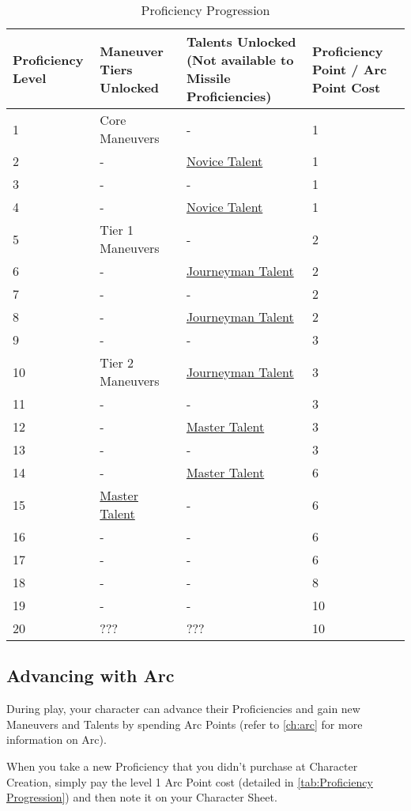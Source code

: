 \documentclass[oneside,11pt,english]{book}
\begin{document}
\begin{longtabu} spread 0pt {X[-2,c] X[c] X[c] X[-1,c]}
	\caption{Proficiency Progression}
	\label{tab:Proficiency Progression}\\
	\rowfont[c]{}Proficiency Level&Maneuver Tiers Unlocked&Talents Unlocked (Not available to Missile Proficiencies)&Proficiency Point / Arc Point Cost\\&	Core Maneuvers&	-&	1\\
	2&	-& 	\hyperref[sec:Novice Talents]{Novice Talent}&	1\\
	3&	-& 	-&	1\\
	4&	-& 	\hyperref[sec:Novice Talents]{Novice Talent}&1\\
	5&	Tier 1 Maneuvers&	-&	2 \\
	6&	-&  	\hyperref[sec:Journeyman Talents]{Journeyman Talent}&2 \\
	7&	-&  	-  	&2 \\
	8&	-&  	\hyperref[sec:Journeyman Talents]{Journeyman Talent}		&2 \\
	9&	-&  	-  	&3 \\
	10&	Tier 2 Maneuvers&	\hyperref[sec:Journeyman Talents]{Journeyman Talent}		&3 \\
	11&	-&  	-  	&3 \\
	12&	-&  	\hyperref[sec:Master Talents]{Master Talent}  	&3 \\
	13&	-&  	-  	&3 \\
	14&	-&  	\hyperref[sec:Master Talents]{Master Talent}  	&6 \\
	15&	\hyperref[sec:Master Talents]{Master Talent}&	-&	6 \\
	16&	-&-&6 \\
	17&	-&-&6 \\
	18&	-&-&8 \\
	19&	-&-&10 \\
	20&	???&  	???  	&10\\
\end{longtabu}

\subsection{Advancing with Arc}

During play, your character can advance their Proficiencies and gain new Maneuvers and Talents by spending Arc Points (refer to \autoref{ch:arc} for more information on Arc).

When you take a new Proficiency that you didn’t purchase at Character Creation, simply pay the level 1 Arc Point cost (detailed in \autoref{tab:Proficiency Progression}) and then note it on your Character Sheet.
\end{document}
